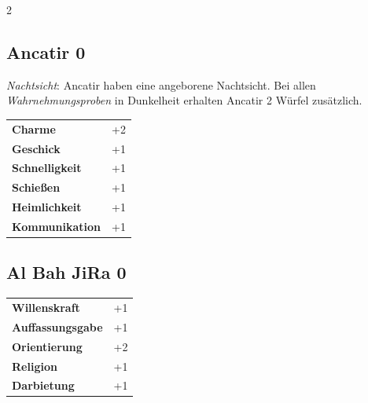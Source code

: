 \begin{multicols}{2}
\begin{tcolorbox}
\end{tcolorbox}

\begin{tcolorbox}
    \subsection*{Ancatir \hfill \small{0 }}
    \tcblower
\textit{Nachtsicht}: Ancatir haben eine angeborene Nachtsicht. Bei allen \textit{Wahrnehmungsproben} in Dunkelheit erhalten Ancatir 2 Würfel zusätzlich.


\vspace{3mm}

\begin{tabular}{@{}ll@{}}
    \textbf{Charme} & +2\\
    \textbf{Geschick} & +1\\
    \textbf{Schnelligkeit} & +1\\
    \textbf{Schießen} & +1\\
    \textbf{Heimlichkeit} & +1\\
    \textbf{Kommunikation} & +1\\
\end{tabular}


\end{tcolorbox}

\begin{tcolorbox}
    \subsection*{Al Bah JiRa \hfill \small{0 }}
    \tcblower




\begin{tabular}{@{}ll@{}}
    \textbf{Willenskraft} & +1\\
    \textbf{Auffassungsgabe} & +1\\
    \textbf{Orientierung} & +2\\
    \textbf{Religion} & +1\\
    \textbf{Darbietung} & +1\\
\end{tabular}



\end{tcolorbox}
\end{multicols}
